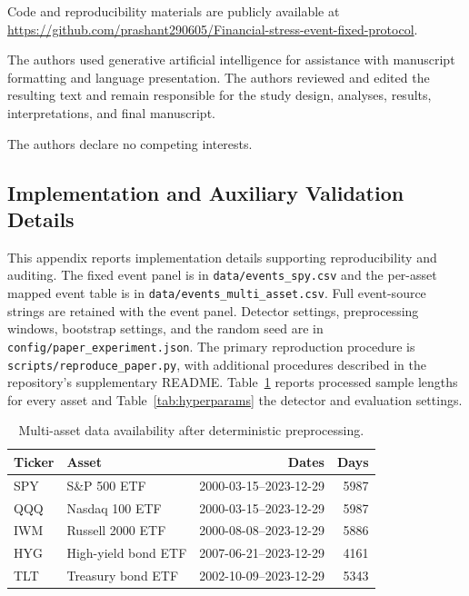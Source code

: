 \documentclass[pdflatex,sn-mathphys-num,iicol]{sn-jnl}
\begin{document}
Code and reproducibility materials are publicly available at \url{https://github.com/prashant290605/Financial-stress-event-fixed-protocol}.

The authors used generative artificial intelligence for assistance with manuscript formatting and language presentation. The authors reviewed and edited the resulting text and remain responsible for the study design, analyses, results, interpretations, and final manuscript.

The authors declare no competing interests.

\begin{appendices}
\renewcommand{\theHtable}{A.\arabic{table}}
\renewcommand{\theHfigure}{A.\arabic{figure}}
\renewcommand{\theHequation}{A.\arabic{equation}}
\section{Implementation and Auxiliary Validation Details}
\label{app:implementation_details}
This appendix reports implementation details supporting reproducibility and auditing. The fixed event panel is in \texttt{data/events\_spy.csv} and the per-asset mapped event table is in \texttt{data/events\_multi\_asset.csv}. Full event-source strings are retained with the event panel. Detector settings, preprocessing windows, bootstrap settings, and the random seed are in \texttt{config/paper\_experiment.json}. The primary reproduction procedure is \texttt{scripts/reproduce\_paper.py}, with additional procedures described in the repository's supplementary README. Table~\ref{tab:asset_availability} reports processed sample lengths for every asset and Table~\ref{tab:hyperparams} the detector and evaluation settings.

\begin{table}[t]
\centering
\caption{Multi-asset data availability after deterministic preprocessing.}
\label{tab:asset_availability}
\scriptsize
\begin{tabular}{llrr}
\toprule
Ticker & Asset & Dates & Days\\
\midrule
SPY & S\&P 500 ETF & 2000-03-15--2023-12-29 & 5987\\
QQQ & Nasdaq 100 ETF & 2000-03-15--2023-12-29 & 5987\\
IWM & Russell 2000 ETF & 2000-08-08--2023-12-29 & 5886\\
HYG & High-yield bond ETF & 2007-06-21--2023-12-29 & 4161\\
TLT & Treasury bond ETF & 2002-10-09--2023-12-29 & 5343\\
\bottomrule
\end{tabular}
\end{table}


\end{appendices}
\end{document}
